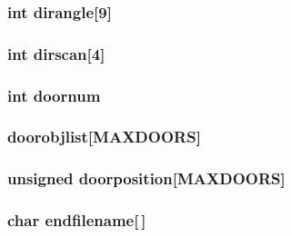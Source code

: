 \label{WL__DEF_8H_a10ebed132303227c107c0a505ebc4681}
\hypertarget{WL__DEF_8H_a3a80e8be3138f31dfac72bcf50a43d62}{
\subsubsection[{dirangle}]{\setlength{\rightskip}{0pt plus 5cm}int {\bf dirangle}\mbox{[}9\mbox{]}}}
\label{WL__DEF_8H_a3a80e8be3138f31dfac72bcf50a43d62}
\hypertarget{WL__DEF_8H_ac9e7de0629d53e5cfa59e985910855c5}{
\subsubsection[{dirscan}]{\setlength{\rightskip}{0pt plus 5cm}int {\bf dirscan}\mbox{[}4\mbox{]}}}
\label{WL__DEF_8H_ac9e7de0629d53e5cfa59e985910855c5}
\hypertarget{WL__DEF_8H_a270ac0143523da1acaf3ad63e7c9f103}{
\subsubsection[{doornum}]{\setlength{\rightskip}{0pt plus 5cm}int {\bf doornum}}}
\label{WL__DEF_8H_a270ac0143523da1acaf3ad63e7c9f103}
\hypertarget{WL__DEF_8H_a19ecae5aac787e9fb8bbc851164b1170}{
\subsubsection[{doorobjlist}]{ {\bf doorobjlist}\mbox{[}MAXDOORS\mbox{]}}}
\label{WL__DEF_8H_a19ecae5aac787e9fb8bbc851164b1170}
\hypertarget{WL__DEF_8H_a40e94301053d665ef509efdce52da5cb}{
\subsubsection[{doorposition}]{\setlength{\rightskip}{0pt plus 5cm}unsigned {\bf doorposition}\mbox{[}MAXDOORS\mbox{]}}}
\label{WL__DEF_8H_a40e94301053d665ef509efdce52da5cb}
\hypertarget{WL__DEF_8H_a507c5edb33c02cb6d10285289532c356}{
\subsubsection[{endfilename}]{\setlength{\rightskip}{0pt plus 5cm}char {\bf endfilename}\mbox{[}$\,$\mbox{]}}}
